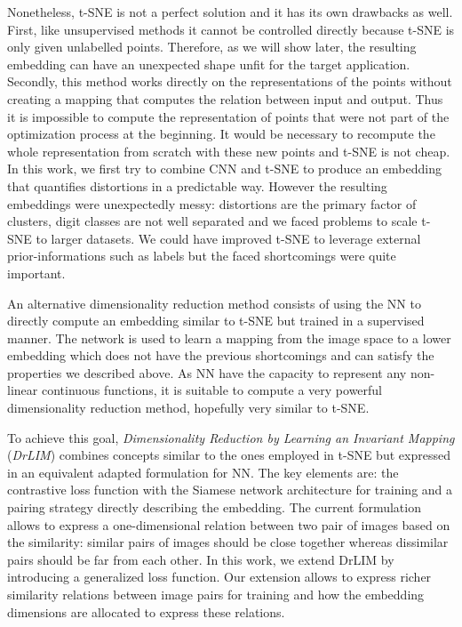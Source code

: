 \documentclass[a4paper,12pt]{report}
\begin{document}
Nonetheless, t-SNE is not a perfect solution and it has its own drawbacks as well.
First, like unsupervised methods it cannot be controlled directly because t-SNE is only given unlabelled points.
Therefore, as we will show later, the resulting embedding can have an unexpected shape unfit for the target application.
Secondly, this method works directly on the representations of the points without creating a mapping that computes the relation between input and output.
Thus it is impossible to compute the representation of points that were not part of the optimization process at the beginning.
It would be necessary to recompute the whole representation from scratch with these new points and t-SNE is not cheap.
In this work, we first try to combine CNN and t-SNE to produce an embedding that quantifies distortions in a predictable way.
However the resulting embeddings were unexpectedly messy: distortions are the primary factor of clusters, digit classes are not well separated and we faced problems to scale t-SNE to larger datasets.
We could have improved t-SNE to leverage external prior-informations such as labels but the faced shortcomings were quite important.

An alternative dimensionality reduction method consists of using the NN to directly compute an embedding similar to t-SNE but trained in a supervised manner.
The network is used to learn a mapping from the image space to a lower embedding which does not have the previous shortcomings and can satisfy the properties we described above.
As NN have the capacity to represent any non-linear continuous functions\cite{csaji2001approximation}, it is suitable to compute a very powerful dimensionality reduction method, hopefully very similar to t-SNE.

To achieve this goal, {\em Dimensionality Reduction by Learning an Invariant Mapping} ({\em DrLIM}) combines concepts similar to the ones employed in t-SNE but expressed in an equivalent adapted formulation for NN\cite{hadsell2006dimensionality}.
The key elements are: the contrastive loss function with the Siamese network architecture for training and a pairing strategy directly describing the embedding.
The current formulation allows to express a one-dimensional relation between two pair of images based on the similarity: similar pairs of images should be close together whereas dissimilar pairs should be far from each other.
In this work, we extend DrLIM by introducing a generalized loss function.
Our extension allows to express richer similarity relations between image pairs for training and how the embedding dimensions are allocated to express these relations.
\end{document}
